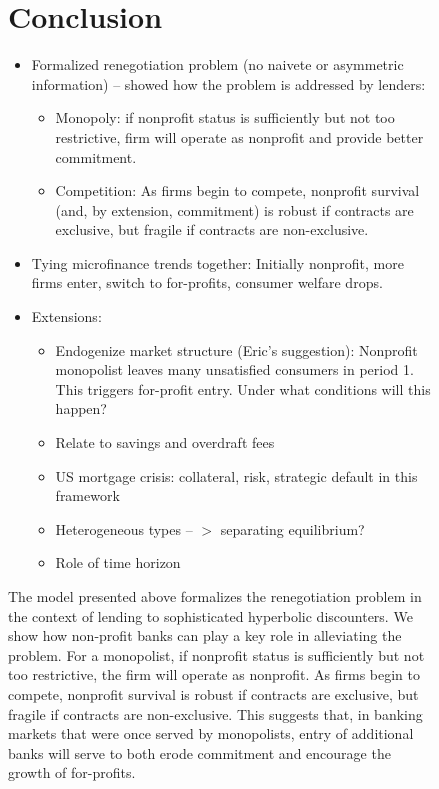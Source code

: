 \documentclass[11pt]{article}%
\begin{document}
\begin{figure}
{\section{Conclusion}

\begin{itemize}
\item Formalized renegotiation problem (no naivete or asymmetric information)
-- showed how the problem is addressed by lenders:

\begin{itemize}
\item Monopoly: if nonprofit status is sufficiently but not too restrictive,
firm will operate as nonprofit and provide better commitment.

\item Competition: As firms begin to compete, nonprofit survival (and, by
extension, commitment) is robust if contracts are exclusive, but fragile if
contracts are non-exclusive.
\end{itemize}

\item Tying microfinance trends together: Initially nonprofit, more firms
enter, switch to for-profits, consumer welfare drops.

\item Extensions:

\begin{itemize}
\item Endogenize market structure (Eric's suggestion): Nonprofit monopolist
leaves many unsatisfied consumers in period 1. This triggers for-profit entry.
Under what conditions will this happen?

\item Relate to savings and overdraft fees

\item US mortgage crisis: collateral, risk, strategic default in this framework

\item Heterogeneous types --%
$>$
separating equilibrium?

\item Role of time horizon
\end{itemize}
\end{itemize}

\bigskip

The model presented above formalizes the renegotiation problem in the context
of lending to sophisticated hyperbolic discounters. We show how non-profit
banks can play a key role in alleviating the problem. For a monopolist, if
nonprofit status is sufficiently but not too restrictive, the firm will
operate as nonprofit. As firms begin to compete, nonprofit survival is robust
if contracts are exclusive, but fragile if contracts are non-exclusive. This
suggests that, in banking markets that were once served by monopolists, entry
of additional banks will serve to both erode commitment and encourage the
growth of for-profits.

}
\end{figure}
\end{document}
